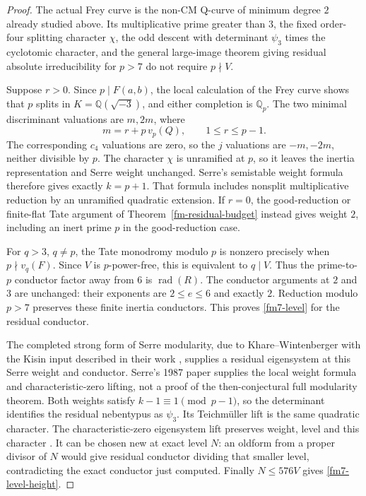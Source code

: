 \begin{proof}
The actual Frey curve is the non-CM Q-curve of minimum degree $2$
already studied above. Its multiplicative prime greater than $3$, the
fixed order-four splitting character $\chi$, the odd descent with
determinant $\psi_3$ times the cyclotomic character, and the general
large-image theorem giving residual absolute irreducibility for $p>7$
do not require $p\nmid V$.

Suppose $r>0$. Since $p\mid F(a,b)$, the local calculation of the Frey
curve shows that $p$ splits in $K=\mathbb Q(\sqrt{-3})$, and either
completion is $\mathbb Q_p$. The two minimal discriminant valuations
are $m,2m$, where
\begin{equation}\label{fm7-tate-depth}
 m=r+p\,v_p(Q),\qquad1\le r\le p-1.
\end{equation}
The corresponding $c_4$ valuations are zero, so the $j$ valuations are
$-m,-2m$, neither divisible by $p$. The character $\chi$ is unramified
at $p$, so it leaves the inertia representation and Serre weight
unchanged. Serre's semistable weight formula
\cite[\S2.9, Proposition~5]{Serre1987Modular} therefore gives exactly
$k=p+1$. That formula includes nonsplit multiplicative reduction by
an unramified quadratic extension. If $r=0$, the good-reduction or
finite-flat Tate argument of Theorem~\ref{fm-residual-budget} instead
gives weight $2$, including an inert prime $p$ in the good-reduction
case.

For $q>3$, $q\ne p$, the Tate monodromy modulo $p$ is nonzero precisely
when $p\nmid v_q(F)$. Since $V$ is $p$-power-free, this is equivalent
to $q\mid V$. Thus the prime-to-$p$ conductor factor away from $6$ is
$\operatorname{rad}(R)$. The conductor arguments at $2$ and $3$ are
unchanged: their exponents are $2\le e\le6$ and exactly $2$. Reduction
modulo $p>7$ preserves these finite inertia conductors. This proves
\eqref{fm7-level} for the residual conductor.

The completed strong form of Serre modularity, due to
Khare--Wintenberger with the Kisin input described in their work
\cite{KhareWintenberger2009Serre}, supplies a residual eigensystem at
this Serre weight and conductor. Serre's 1987 paper supplies the local
weight formula and characteristic-zero lifting, not a proof of the
then-conjectural full modularity theorem. Both weights satisfy
$k-1\equiv1\pmod{p-1}$, so the determinant identifies the residual
nebentypus as $\psi_3$. Its Teichm\"uller lift is the same quadratic
character. The characteristic-zero eigensystem lift preserves weight,
level and this character \cite[\S3.1.6]{Serre1987Modular}.
It can be chosen new at exact level $N$: an oldform from a proper divisor
of $N$ would give residual conductor dividing that smaller level,
contradicting the exact conductor just computed. Finally $N\le576V$
gives \eqref{fm7-level-height}.
\end{proof}

